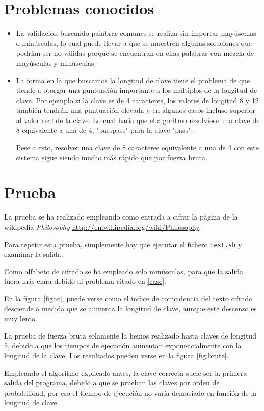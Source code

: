 \documentclass[12pt]{report}
\begin{document}
\section{Problemas conocidos}
\begin{itemize}
\item \label{case}La validación buscando palabras comunes se realiza sin importar mayúsculas o minúsculas, lo 
cual puede llevar a que se muestren algunas soluciones que podrían ser no válidas porque se encuentran en ellas
palabras con mezcla de mayúsculas y minúsculas.
\item La forma en la que buscamos la longitud de clave tiene el problema de que tiende a otorgar una puntuación importante a los múltiplos de la longitud de clave. Por ejemplo si la clave es de 4 caracteres, los valores de longitud 8 y 12 también tendrán una puntuación elevada y en algunos casos incluso superior al valor real de la clave. Lo cual haría que el algoritmo resolviese una clave de 8 equivalente a una de 4, "passpass" para la clave "pass".

Pese a esto, resolver una clave de 8 caracteres equivalente a una de 4 con este sistema sigue siendo mucho más rápido que por fuerza bruta.
\end{itemize}

\section{Prueba}
La prueba se ha realizado empleando como entrada a cifrar la página de la wikipedia \textit{Philosophy}
\url{http://en.wikipedia.org/wiki/Philosophy}.

Para repetir esta prueba, simplemente hay que ejecutar el fichero \texttt{test.sh} y examinar la salida.

Como alfabeto de cifrado se ha empleado solo minúsculas, para que la salida fuera más clara debido al problema 
citado en \ref{case}.

En la figura \ref{fig:ic}, puede verse como el índice de coincidencia del texto cifrado desciende a medida que se 
aumenta la longitud de clave, aunque este descenso es muy lento.

La prueba de fuerza bruta solamente la hemos realizado hasta claves de longitud 5, debido a que los tiempos de ejecución 
aumentan exponencialmente con la longitud de la clave. Los resultados pueden verse en la figura \ref{fig:brute}.

Empleando el algoritmo explicado antes, la clave correcta suele ser la primera salida del programa, debido a que se prueban las claves por orden de probabilidad, por eso el tiempo de ejecución no varía demasiado en función de la longitud de clave.
\end{document}
